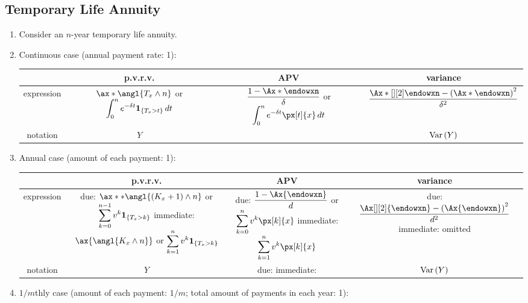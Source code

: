 \subsection{Temporary Life Annuity}
\begin{enumerate}
\item Consider an \(n\)-year temporary life annuity.
\item \label{it:cts-tmp-annuity-fmlas}
Continuous case (annual payment rate: 1):

\begin{tabular}{cccc}
\toprule
&p.v.r.v.&APV&variance\\
\midrule
expression&\(\ax*{\angl{T_x\wedge n}}\) or \(\displaystyle\int_{0}^{n}e^{-\delta t}\mathbf{1}_{\left\{T_x>t\right\}}\,dt\)
&\(\displaystyle \frac{1-\Ax*{\endowxn}}{\delta}\) or \(\displaystyle\int_{0}^{n}e^{-\delta t}\px[t]{x}\,dt\)
&\(\displaystyle \frac{\Ax*[][2]{\endowxn}-\qty(\Ax*{\endowxn})^2}{\delta^2}\)\\
notation&\(Y\)&{\(\ax*{\endowxn}\)}&\(\operatorname{Var}\qty(Y)\)\\
\bottomrule
\end{tabular}
\item \label{it:ann-tmp-annuity-fmlas}
Annual case (amount of each payment: 1):

\begin{tabular}{cccc}
\toprule
&p.v.r.v.&APV&variance\\
\midrule
expression&
\makecell{
due: \(\ax**{\angl{\qty(K_x+1)\wedge n}}\) or \(\displaystyle\sum_{k=0}^{n-1}v^k\mathbf{1}_{\left\{T_x>k\right\}}\)\\
immediate: \(\ax{\angl{K_x\wedge n}}\) or \(\displaystyle\sum_{k=1}^{n}v^k\mathbf{1}_{\left\{T_x>k\right\}}\)
}
&\makecell{
due: \(\displaystyle \frac{1-\Ax{\endowxn}}{d}\) or \(\displaystyle\sum_{k=0}^{n}v^k\px[k]{x}\)\\
immediate: \(\displaystyle\sum_{k=1}^{n}v^k\px[k]{x}\)
}
&\makecell{due: \(\displaystyle \frac{\Ax[][2]{\endowxn}-\qty(\Ax{\endowxn})^2}{d^2}\)\\
immediate: omitted
}\\
notation&\(Y\)&
\makecell{due: \defn{\(\ax**{\endowxn}\)}\\
immediate: {\(\ax{\endowxn}\)}}&\(\operatorname{Var}\qty(Y)\)\\
\bottomrule
\end{tabular}

\item \label{it:1m-tmp-annuity-fmlas}
\(1/m\)thly case (amount of each payment: \(1/m\); total amount of payments in
each year: 1):


\end{enumerate}
